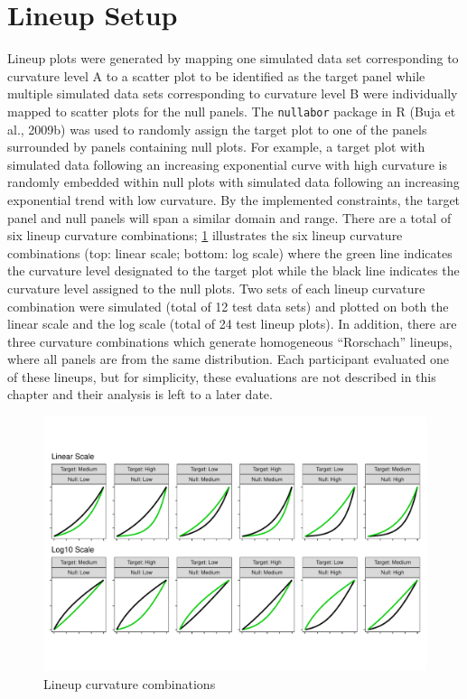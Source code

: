 \documentclass[print]{nuthesis}
\begin{document}
\hypertarget{lineup-setup}{%
\section{Lineup Setup}\label{lineup-setup}}

Lineup plots were generated by mapping one simulated data set corresponding to curvature level A to a scatter plot to be identified as the target panel while multiple simulated data sets corresponding to curvature level B were individually mapped to scatter plots for the null panels.
The \texttt{nullabor} package in R (Buja et al., 2009b) was used to randomly assign the target plot to one of the panels surrounded by panels containing null plots.
For example, a target plot with simulated data following an increasing exponential curve with high curvature is randomly embedded within null plots with simulated data following an increasing exponential trend with low curvature.
By the implemented constraints, the target panel and null panels will span a similar domain and range.
There are a total of six lineup curvature combinations; \cref{fig:curvature-combination-example} illustrates the six lineup curvature combinations (top: linear scale; bottom: log scale) where the green line indicates the curvature level designated to the target plot while the black line indicates the curvature level assigned to the null plots.
Two sets of each lineup curvature combination were simulated (total of 12 test data sets) and plotted on both the linear scale and the log scale (total of 24 test lineup plots).
In addition, there are three curvature combinations which generate homogeneous ``Rorschach'' lineups, where all panels are from the same distribution.
Each participant evaluated one of these lineups, but for simplicity, these evaluations are not described in this chapter and their analysis is left to a later date.

\begin{figure}[tbp]

{\centering \includegraphics[width=1\linewidth,]{thesis_files/figure-latex/curvature-combination-example-1} 

}

\caption{Lineup curvature combinations}\label{fig:curvature-combination-example}
\end{figure}
\end{document}
